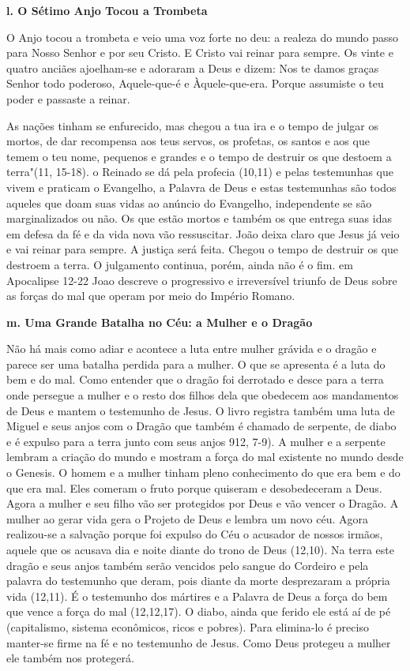 \documentclass[
]{book}
\begin{document}
\textbf{l. O Sétimo Anjo Tocou a Trombeta}

O Anjo tocou a trombeta e veio uma voz forte no deu: a realeza do mundo passo para Nosso Senhor e por seu Cristo. E Cristo vai reinar para sempre. Os vinte e quatro anciães ajoelham-se e adoraram a Deus e dizem: Nos te damos graças Senhor todo poderoso, Aquele-que-é e Àquele-que-era. Porque assumiste o teu poder e passaste a reinar.

As nações tinham se enfurecido, mas chegou a tua ira e o tempo de julgar os mortos, de dar recompensa aos teus servos, os profetas, os santos e aos que temem o teu nome, pequenos e grandes e o tempo de destruir os que destoem a terra"(11, 15-18). o Reinado se dá pela profecia (10,11) e pelas testemunhas que vivem e praticam o Evangelho, a Palavra de Deus e estas testemunhas são todos aqueles que doam suas vidas ao anúncio do Evangelho, independente se são marginalizados ou não. Os que estão mortos e também os que entrega suas idas em defesa da fé e da vida nova vão ressuscitar. João deixa claro que Jesus já veio e vai reinar para sempre. A justiça será feita. Chegou o tempo de destruir os que destroem a terra. O julgamento continua, porém, ainda não é o fim. em Apocalipse 12-22 Joao descreve o progressivo e irreversível triunfo de Deus sobre as forças do mal que operam por meio do Império Romano.

\textbf{m. Uma Grande Batalha no Céu: a Mulher e o Dragão}

Não há mais como adiar e acontece a luta entre mulher grávida e o dragão e parece ser uma batalha perdida para a mulher. O que se apresenta é a luta do bem e do mal. Como entender que o dragão foi derrotado e desce para a terra onde persegue a mulher e o resto dos filhos dela que obedecem aos mandamentos de Deus e mantem o testemunho de Jesus. O livro registra também uma luta de Miguel e seus anjos com o Dragão que também é chamado de serpente, de diabo e é expulso para a terra junto com seus anjos 912, 7-9). A mulher e a serpente lembram a criação do mundo e mostram a força do mal existente no mundo desde o Genesis. O homem e a mulher tinham pleno conhecimento do que era bem e do que era mal. Eles comeram o fruto porque quiseram e desobedeceram a Deus. Agora a mulher e seu filho vão ser protegidos por Deus e vão vencer o Dragão. A mulher ao gerar vida gera o Projeto de Deus e lembra um novo céu. Agora realizou-se a salvação porque foi expulso do Céu o acusador de nossos irmãos, aquele que os acusava dia e noite diante do trono de Deus (12,10). Na terra este dragão e seus anjos também serão vencidos pelo sangue do Cordeiro e pela palavra do testemunho que deram, pois diante da morte desprezaram a própria vida (12,11). É o testemunho dos mártires e a Palavra de Deus a força do bem que vence a força do mal (12,12,17). O diabo, ainda que ferido ele está aí de pé (capitalismo, sistema econômicos, ricos e pobres). Para elimina-lo é preciso manter-se firme na fé e no testemunho de Jesus. Como Deus protegeu a mulher ele também nos protegerá.
\end{document}
